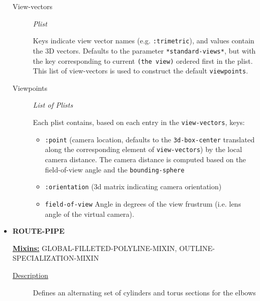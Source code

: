 \documentclass [11pt]{book}
\begin{document}
\begin{itemize}
\begin{description}
\item [View-vectors]
\emph{Plist}

 Keys indicate view vector names (e.g. \texttt{:trimetric}), and values contain the 3D vectors. Defaults to the
parameter \texttt{*standard-views*}, but with the key corresponding to current \texttt{(the view)} ordered
first in the plist. This list of view-vectors is used to construct the default \texttt{viewpoints}.




\item [Viewpoints]
\emph{List of Plists}

 Each plist contains, based on each entry in the \texttt{view-vectors}, keys:


\begin{itemize}

\item \texttt{:point} (camera location, defaults to the \texttt{3d-box-center} translated
along the corresponding element of \texttt{view-vectors}) by the local camera distance.
The camera distance is computed based on the field-of-view angle and
the \texttt{bounding-sphere}


\item \texttt{:orientation} (3d matrix indicating camera orientation)


\item \texttt{field-of-view} Angle in degrees of the view frustrum (i.e. lens angle of the virtual camera).


\end{itemize}





\end{description}







\item {}
\textbf{ROUTE-PIPE}


\textbf{
\underline{Mixins:}} GLOBAL-FILLETED-POLYLINE-MIXIN, OUTLINE-SPECIALIZATION-MIXIN





\begin{description}

\item [
\underline{Description}]


Defines an alternating set of cylinders and torus sections for the elbows




\end{description}
\end{itemize}
\end{document}
